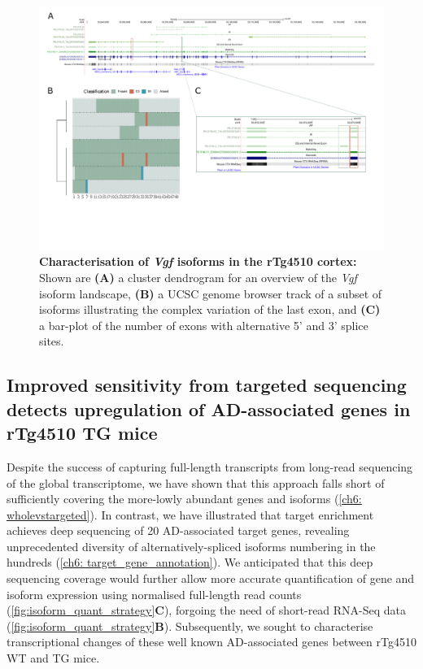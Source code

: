 \begin{landscape}
	\begin{figure}[htp]
		\centering
		\includegraphics[page=14,trim={0 3cm 0 0},scale = 0.85]{Figures/TargetGenes_Annotation_Landscape.pdf}
		\captionsetup{width=1.3\textwidth}
		\caption[Characterisation of \textit{Vgf} isoforms in the rTg4510 cortex]%
		{\textbf{Characterisation of \textit{Vgf} isoforms in the rTg4510 cortex:} Shown are \textbf{(A)} a cluster dendrogram for an overview of the \textit{Vgf} isoform landscape, \textbf{(B)} a UCSC genome browser track of a subset of isoforms illustrating the complex variation of the last exon, and \textbf{(C)} a bar-plot of the number of exons with alternative 5' and 3' splice sites.}   
		\label{fig:vgf}
	\end{figure}
\end{landscape}
\restoregeometry

\newpage
\subsection{Improved sensitivity from targeted sequencing detects upregulation of AD-associated genes in rTg4510 TG mice}
Despite the success of capturing full-length transcripts from long-read sequencing of the global transcriptome, we have shown that this approach falls short of sufficiently covering the more-lowly abundant genes and isoforms (\cref{ch6: wholevstargeted}). In contrast, we have illustrated that target enrichment achieves deep sequencing of 20 AD-associated target genes, revealing unprecedented diversity of alternatively-spliced isoforms numbering in the hundreds (\cref{ch6: target_gene_annotation}). We anticipated that this deep sequencing coverage would further allow more accurate quantification of gene and isoform expression using normalised full-length read counts (\cref{fig:isoform_quant_strategy}\textbf{C}), forgoing the need of short-read RNA-Seq data (\cref{fig:isoform_quant_strategy}\textbf{B}). Subsequently, we sought to characterise transcriptional changes of these well known AD-associated genes between rTg4510 WT and TG mice.

